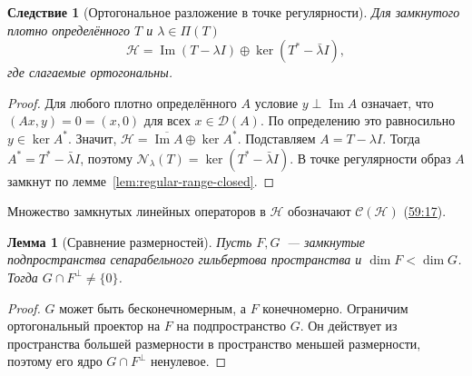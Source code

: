 \documentclass[11pt,a4paper]{article}
\theoremstyle{plain}
\newtheorem{lemma}[theorem]{Лемма}
\newtheorem{corollary}[theorem]{Следствие}
\theoremstyle{definition}
\newcommand{\Hh}{\mathcal H}
\newcommand{\Dom}{\mathcal D}
\newcommand{\id}{I}
\newcommand{\at}[3]{\href{https://www.youtube.com/watch?v=#1&t=#2s}{#3}}
\begin{document}
\begin{corollary}[Ортогональное разложение в точке регулярности]
\label{cor:regularity-decomposition}
Для замкнутого плотно определённого $T$ и $\lambda\in\Pi(T)$
\[
 \Hh=\operatorname{Im}(T-\lambda\id)\oplus\ker(T^*-\bar\lambda\id),
\]
где слагаемые ортогональны.
\end{corollary}
\begin{proof}
Для любого плотно определённого $A$ условие
$y\perp\operatorname{Im}A$ означает, что $(Ax,y)=0=(x,0)$ для
всех $x\in\Dom(A)$. По определению это равносильно $y\in\ker A^*$.
Значит, $\Hh=\overline{\operatorname{Im}A}\oplus\ker A^*$.
Подставляем $A=T-\lambda\id$. Тогда $A^*=T^*-\bar\lambda\id$,
поэтому $\mathcal N_\lambda(T)=\ker(T^*-\bar\lambda\id)$.
В точке регулярности образ $A$ замкнут по
лемме~\ref{lem:regular-range-closed}.
\end{proof}
Множество замкнутых линейных операторов в $\Hh$ обозначают
$\mathcal C(\Hh)$ (\at{dRCTK4VqBTk}{3557}{59:17}).

\begin{lemma}[Сравнение размерностей]
\label{lem:orthogonal-vector-in-larger-space}
Пусть $F,G$~--- замкнутые подпространства сепарабельного
гильбертова пространства и $\dim F<\dim G$. Тогда
$G\cap F^\perp\ne\{0\}$.
\end{lemma}
\begin{proof}
$G$ может быть бесконечномерным, а $F$ конечномерно.
Ограничим ортогональный проектор на $F$ на подпространство $G$.
Он действует из пространства большей размерности в пространство
меньшей размерности, поэтому его ядро $G\cap F^\perp$ ненулевое.
\end{proof}
\end{document}
